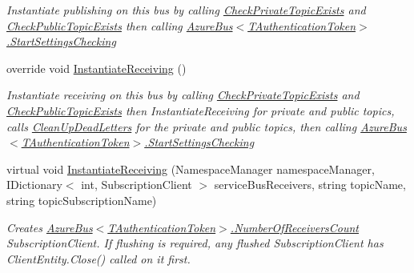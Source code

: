 \begin{DoxyCompactItemize}
\begin{DoxyCompactList}\small\item\em Instantiate publishing on this bus by calling \hyperlink{classCqrs_1_1Azure_1_1ServiceBus_1_1AzureServiceBus_add2d99ff99f1af5470082b1de340c04a_add2d99ff99f1af5470082b1de340c04a}{Check\+Private\+Topic\+Exists} and \hyperlink{classCqrs_1_1Azure_1_1ServiceBus_1_1AzureServiceBus_aae464d1d93ae6600ff5ace028160dd3c_aae464d1d93ae6600ff5ace028160dd3c}{Check\+Public\+Topic\+Exists} then calling \hyperlink{classCqrs_1_1Azure_1_1ServiceBus_1_1AzureBus_acb7f47329c17646805545e78d0776efe_acb7f47329c17646805545e78d0776efe}{Azure\+Bus$<$\+T\+Authentication\+Token$>$.\+Start\+Settings\+Checking} \end{DoxyCompactList}\item 
override void \hyperlink{classCqrs_1_1Azure_1_1ServiceBus_1_1AzureServiceBus_ad49a2d063279ec98443e7f1d69178cfa_ad49a2d063279ec98443e7f1d69178cfa}{Instantiate\+Receiving} ()
\begin{DoxyCompactList}\small\item\em Instantiate receiving on this bus by calling \hyperlink{classCqrs_1_1Azure_1_1ServiceBus_1_1AzureServiceBus_add2d99ff99f1af5470082b1de340c04a_add2d99ff99f1af5470082b1de340c04a}{Check\+Private\+Topic\+Exists} and \hyperlink{classCqrs_1_1Azure_1_1ServiceBus_1_1AzureServiceBus_aae464d1d93ae6600ff5ace028160dd3c_aae464d1d93ae6600ff5ace028160dd3c}{Check\+Public\+Topic\+Exists} then Instantiate\+Receiving for private and public topics, calls \hyperlink{classCqrs_1_1Azure_1_1ServiceBus_1_1AzureServiceBus_a8d1d5833d49b7793933825f2a13fb8b7_a8d1d5833d49b7793933825f2a13fb8b7}{Clean\+Up\+Dead\+Letters} for the private and public topics, then calling \hyperlink{classCqrs_1_1Azure_1_1ServiceBus_1_1AzureBus_acb7f47329c17646805545e78d0776efe_acb7f47329c17646805545e78d0776efe}{Azure\+Bus$<$\+T\+Authentication\+Token$>$.\+Start\+Settings\+Checking} \end{DoxyCompactList}\item 
virtual void \hyperlink{classCqrs_1_1Azure_1_1ServiceBus_1_1AzureServiceBus_adba7b34f05055ed65baa54435a68321c_adba7b34f05055ed65baa54435a68321c}{Instantiate\+Receiving} (Namespace\+Manager namespace\+Manager, I\+Dictionary$<$ int, Subscription\+Client $>$ service\+Bus\+Receivers, string topic\+Name, string topic\+Subscription\+Name)
\begin{DoxyCompactList}\small\item\em Creates \hyperlink{classCqrs_1_1Azure_1_1ServiceBus_1_1AzureBus_a65ca2b61bf8f2dba9d0e0f54ec64c2b9_a65ca2b61bf8f2dba9d0e0f54ec64c2b9}{Azure\+Bus$<$\+T\+Authentication\+Token$>$.\+Number\+Of\+Receivers\+Count} Subscription\+Client. If flushing is required, any flushed Subscription\+Client has Client\+Entity.\+Close() called on it first. \end{DoxyCompactList}\item 

\end{DoxyCompactItemize}
